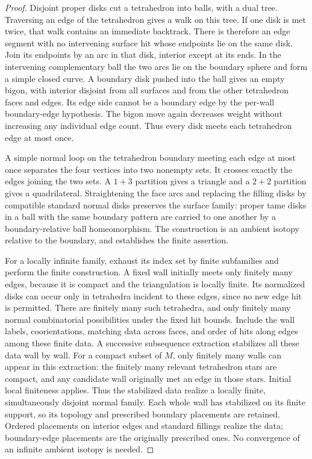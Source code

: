 \documentclass[11pt]{article}
\numberwithin{equation}{section}
\theoremstyle{definition}
\theoremstyle{remark}
\begin{document}
\begin{proof}
Disjoint proper disks cut a tetrahedron into balls, with a dual tree.
Traversing an edge of the tetrahedron gives a walk on this tree.  If one disk
is met twice, that walk contains an immediate backtrack.  There is therefore
an edge segment with no intervening surface hit whose endpoints lie on the
same disk.  Join its endpoints by an arc in that disk, interior except at its
ends.  In the intervening complementary ball the two arcs lie on the boundary
sphere and form a simple closed curve.  A boundary disk pushed into the ball
gives an empty bigon, with interior disjoint from all surfaces and from the
other tetrahedron faces and edges.  Its edge side cannot be a boundary edge
by the per-wall boundary-edge hypothesis.  The bigon move again decreases
weight without increasing any individual edge count.  Thus every disk meets
each tetrahedron edge at most once.

A simple normal loop on the tetrahedron boundary meeting each edge at most
once separates the four vertices into two nonempty sets.  It crosses exactly
the edges joining the two sets.  A $1+3$ partition gives a triangle and a
$2+2$ partition gives a quadrilateral.  Straightening the face arcs and
replacing the filling disks by compatible standard normal disks preserves
the surface family: proper tame disks in a ball with the same boundary
pattern are carried to one another by a boundary-relative ball
homeomorphism.  The construction is an ambient isotopy relative to the
boundary, and establishes the finite assertion.

For a locally infinite family, exhaust its index set by finite subfamilies
and perform the finite construction.  A fixed wall initially meets only
finitely many edges, because it is compact and the triangulation is locally
finite.  Its normalized disks can occur only in tetrahedra incident to these
edges, since no new edge hit is permitted.  There are finitely many such
tetrahedra, and only finitely many normal combinatorial possibilities under
the fixed hit bounds.  Include the wall labels, coorientations, matching data
across faces, and order of hits along edges among these finite data.  A
successive subsequence extraction stabilizes all these data wall by wall.
For a compact subset of $M$, only finitely many walls can appear in this
extraction: the finitely many relevant tetrahedron stars are compact, and
any candidate wall originally met an edge in those stars.  Initial local
finiteness applies.  Thus the stabilized data realize a locally finite,
simultaneously disjoint normal family.  Each whole wall has stabilized on its
finite support, so its topology and prescribed boundary placements are
retained.  Ordered placements on interior edges and standard fillings realize
the data; boundary-edge placements are the originally prescribed ones.
No convergence of an infinite ambient isotopy is needed.
\end{proof}
\end{document}
